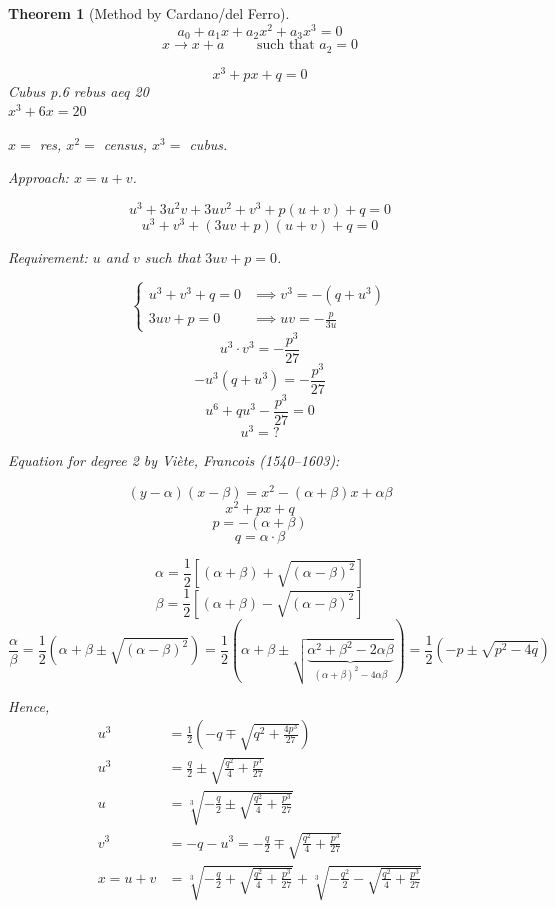 \documentclass{article}
\newtheorem{theorem}{Theorem}  \numberwithin{theorem}{section}
\begin{document}
\begin{theorem}[Method by Cardano/del Ferro] %
  \[ a_0 + a_1 x + a_2 x^2 + a_3 x^3 = 0 \]
  \[ x \to x + a \qquad \text{ such that } a_2 = 0 \]

  \[ x^3 + px + q = 0 \]
  Cubus p.6 rebus aeq 20 \\
  $x^3 + 6x = 20$

  $x = $ res, $x^2 = $ census, $x^3 = $ cubus.

  Approach: $x = u + v$.

  \[ u^3 + 3u^2v + 3uv^2 + v^3 + p(u + v) + q = 0 \]
  \[ u^3 + v^3 + (3uv + p)(u + v) + q = 0 \]

  Requirement:
  $u$ and $v$ such that $3uv + p = 0$.

  \[
    \begin{cases}
      u^3 + v^3 + q = 0 & \implies v^3 = -(q + u^3) \\
      3uv + p = 0 & \implies uv = -\frac{p}{3u}
    \end{cases}
  \]
  \[ u^3 \cdot v^3 = -\frac{p^3}{27} \]
  \[ -u^3 (q + u^3) = -\frac{p^3}{27} \]
  \[ u^6 + qu^3 - \frac{p^3}{27} = 0 \]
  \[ u^3 = ? \]

  Equation for degree 2 by Vi\`ete, Francois (1540--1603):

  \[ (y - \alpha)(x - \beta) = x^2 - (\alpha + \beta) x + \alpha \beta \]
  \[ x^2 + px + q \]
  \[ p = -(\alpha + \beta) \]
  \[ q = \alpha \cdot \beta \]

  \[ \alpha = \frac12 \left[(\alpha + \beta) + \sqrt{(\alpha - \beta)^2}\right] \]
  \[ \beta = \frac12 \left[(\alpha + \beta) - \sqrt{(\alpha - \beta)^2}\right] \]
  \[
    \frac\alpha\beta = \frac12 \left(\alpha + \beta \pm \sqrt{(\alpha - \beta)^2}\right)
    = \frac12 \left(\alpha + \beta \pm \sqrt{\underbrace{\alpha^2 + \beta^2 - 2\alpha\beta}_{(\alpha + \beta)^2 - 4\alpha\beta}}\right)
    = \frac12 \left(-p \pm \sqrt{p^2 - 4q}\right)
  \]

  Hence,
  \begin{align*}
    u^3 &= \frac12\left(-q \mp \sqrt{q^2 + \frac{4p^3}{27}}\right) \\
    u^3 &= \frac{q}2 \pm \sqrt{\frac{q^2}{4} + \frac{p^3}{27}} \\
    u &= \sqrt[3]{-\frac{q}2 \pm \sqrt{\frac{q^2}{4} + \frac{p^3}{27}}} \\
    v^3 &= -q - u^3 = -\frac{q}{2} \mp \sqrt{\frac{q^2}{4} + \frac{p^3}{27}} \\
    x = u + v &= \sqrt[3]{-\frac{q}2 + \sqrt{\frac{q^2}{4} + \frac{p^3}{27}}} + \sqrt[3]{-\frac{q^2}{2} - \sqrt{\frac{q^2}{4} + \frac{p^3}{27}}}
  \end{align*}
\end{theorem}
\end{document}
